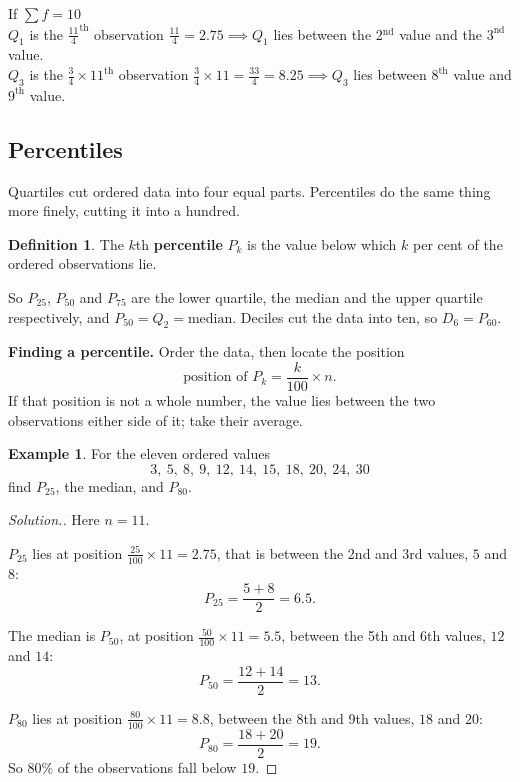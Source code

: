 \documentclass[11pt,a4paper]{article}
\theoremstyle{definition}
\newtheorem{definition}[thm]{Definition}
\newtheorem{example}[thm]{Example}
\newenvironment{solution}
  {\renewcommand{\qedsymbol}{}\begin{proof}[\textit{Solution}.]}
  {\end{proof}}
\begin{document}
If $\sum f=10$\\[1ex]
$Q_1$ is the $\frac{11}{4}^{\text{th}}$ observation $\frac{11}{4}=2.75\implies Q_1$ lies between the 2$^{\text{nd}}$ value and the $3^{\text{nd}}$ value.\\[1ex]
$Q_3$ is the $\frac{3}{4}\times 11^{\text{th}}$ observation $\frac{3}{4}\times 11=\frac{33}{4}=8.25\implies Q_3$ lies between $8^{\text{th}}$ value and $9^{\text{th}}$ value.\\[1ex]

\subsection{Percentiles}

Quartiles cut ordered data into four equal parts. Percentiles do the same thing more
finely, cutting it into a hundred.

\begin{definition}
The $k$th \textbf{percentile} $P_k$ is the value below which $k$ per cent of the ordered
observations lie.
\end{definition}

So $P_{25}$, $P_{50}$ and $P_{75}$ are the lower quartile, the median and the upper
quartile respectively, and $P_{50}=Q_2=\text{median}$. Deciles cut the data into ten, so
$D_6=P_{60}$.

\textbf{Finding a percentile.} Order the data, then locate the position
\[\text{position of }P_k=\frac{k}{100}\times n.\]
If that position is not a whole number, the value lies between the two observations either
side of it; take their average.

\begin{example}
For the eleven ordered values
\[3,\ 5,\ 8,\ 9,\ 12,\ 14,\ 15,\ 18,\ 20,\ 24,\ 30\]
find $P_{25}$, the median, and $P_{80}$.
\end{example}

\begin{solution}
Here $n=11$.

$P_{25}$ lies at position $\tfrac{25}{100}\times 11=2.75$, that is between the 2nd and 3rd
values, $5$ and $8$:
\[P_{25}=\frac{5+8}{2}=6.5.\]

The median is $P_{50}$, at position $\tfrac{50}{100}\times 11=5.5$, between the 5th and 6th
values, $12$ and $14$:
\[P_{50}=\frac{12+14}{2}=13.\]

$P_{80}$ lies at position $\tfrac{80}{100}\times 11=8.8$, between the 8th and 9th values,
$18$ and $20$:
\[P_{80}=\frac{18+20}{2}=19.\]
So $80\%$ of the observations fall below $19$.
\end{solution}
\end{document}
